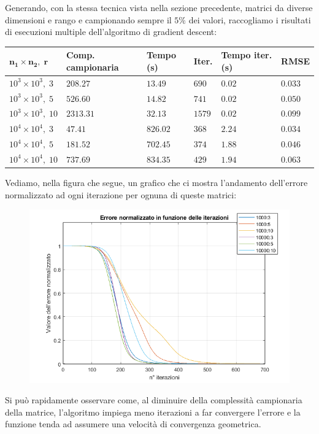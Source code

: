 \documentclass[12pt,a4paper]{report}
\begin{document}
Generando, con la stessa tecnica vista nella sezione precedente,
matrici da diverse dimensioni e rango
e campionando sempre il $5\%$ dei valori, raccogliamo i risultati
di esecuzioni multiple dell'algoritmo di gradient descent:
\begin{table}[H]
  \centering
  \begin{tabular}{@{}llllll@{}}
  \toprule
  \textbf{$\boldsymbol{n_1 \times n_2, \; r}$} & \textbf{Comp. campionaria} & \textbf{Tempo (s)} & \textbf{Iter.} & \textbf{Tempo iter. (s)} & \textbf{RMSE} \\ \midrule
  $10^3 \times 10^3, \; 3$  & $208.27$  & $13.49$   & $690$     & $0.02$     & $0.033$     \\ \midrule
  $10^3 \times 10^3, \; 5$  & $526.60$  & $14.82$   & $741$     & $0.02$     & $0.050$     \\ \midrule
  $10^3 \times 10^3, \; 10$ & $2313.31$ & $32.13$   & $1579$    & $0.02$     & $0.099$     \\ \midrule
  $10^4 \times 10^4, \; 3$  & $47.41$   & $826.02$  & $368$     & $2.24$     & $0.034$     \\ \midrule
  $10^4 \times 10^4, \; 5$  & $181.52$  & $702.45$  & $374$     & $1.88$     & $0.046$     \\ \midrule
  $10^4 \times 10^4, \; 10$ & $737.69$  & $834.35$  & $429$     & $1.94$     & $0.063$     \\ \bottomrule
  \end{tabular}
\end{table}

Vediamo, nella figura che segue, un grafico che ci mostra l'andamento dell'errore normalizzato
ad ogni iterazione per ognuna di queste matrici:
\begin{figure}[H]
  \centering
  \includegraphics[width=\textwidth]{Figures/errors}
\end{figure}
Si può rapidamente osservare come, al diminuire della complessità campionaria della matrice,
l'algoritmo impiega meno iterazioni a far convergere l'errore e la funzione
tenda ad assumere una velocità di convergenza geometrica.




\cleardoublepage{} %
\end{document}

